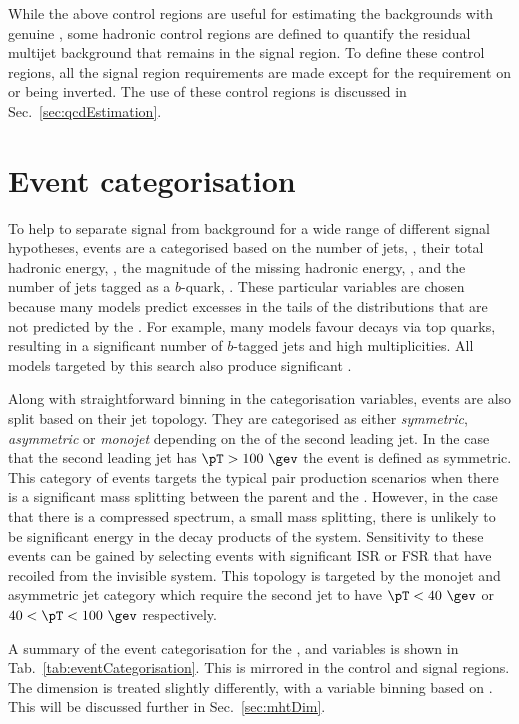 While the above control regions are useful for estimating the \SM
backgrounds with genuine \MET, some hadronic control regions are
defined to quantify the residual \QCD multijet background that remains
in the signal region. To define these control regions, all the signal
region requirements are made except for the requirement on \bdphi or
\mhtmet being inverted. The use of these control regions is
discussed in Sec.~\ref{sec:qcdEstimation}.

\section{Event categorisation}
\label{sec:categorisation}

To help to separate signal from background for a wide range of
different signal hypotheses, events are a categorised based on the
number of jets, \nj, their total hadronic energy, \HT, the magnitude
of the missing hadronic energy, \MHT, and the number of jets tagged as
a $b$-quark, \nb. These particular variables are chosen because many
\BSM models predict excesses in the tails of the distributions that
are not predicted by the \SM. For example, many \SUSY models favour
decays via top quarks, resulting in a significant number of $b$-tagged
jets and high \nj multiplicities. All \BSM models targeted by this
search also produce significant \MHT.

Along with straightforward binning in the categorisation variables,
events are also split based on their jet topology. They are
categorised as either \emph{symmetric}, \emph{asymmetric} or
\emph{monojet} depending on the \pT of the second leading
jet. In the case that the second leading jet has $\pT>100~\gev$ the
event is defined as symmetric. This category of events targets the
typical \SUSY pair production scenarios when there is a significant
mass splitting between the \SUSY parent and the \LSP. However, in the
case that there is a compressed spectrum, a small mass splitting,
there is unlikely to be significant energy in the \SM decay products
of the \SUSY system. Sensitivity to these events can be gained by
selecting events with significant \ac{ISR} or \ac{FSR} that have
recoiled from the invisible \SUSY system. This topology is targeted by
the monojet and asymmetric jet category which require the second jet
to have $\pT<40~\gev$ or $40<\pT<100~\gev$ respectively.

A summary of the event categorisation for the \nb, \njet and \HT
variables is shown in Tab.~\ref{tab:eventCategorisation}. This is
mirrored in the control and signal regions. The \MHT dimension is
treated slightly differently, with a variable binning based on \HT.
This will be discussed further in Sec.~\ref{sec:mhtDim}.

